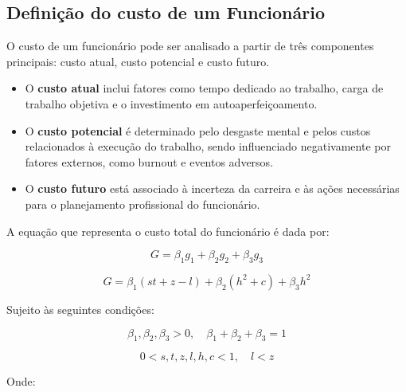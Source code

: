 \documentclass[
	article,			%
	11pt,				%
	oneside,			%
	a4paper,			%
	english,			%
	brazil,				%
	sumario=tradicional
	]{abntex2}
\begin{document}
\subsection{Definição do custo de um Funcionário}

O custo de um funcionário pode ser analisado a partir de três componentes principais: custo atual, custo potencial e custo futuro.

\begin{itemize}
    \item O \textbf{custo atual} inclui fatores como tempo dedicado ao trabalho, carga de trabalho objetiva e o investimento em autoaperfeiçoamento.
    \item O \textbf{custo potencial} é determinado pelo desgaste mental e pelos custos relacionados à execução do trabalho, sendo influenciado negativamente por fatores externos, como burnout e eventos adversos.
    \item O \textbf{custo futuro} está associado à incerteza da carreira e às ações necessárias para o planejamento profissional do funcionário.
\end{itemize}

A equação que representa o custo total do funcionário é dada por:

\begin{equation}
    G = \beta_1 g_1 + \beta_2 g_2 + \beta_3 g_3
\end{equation}

\begin{equation}
    G = \beta_1 (s t + z - l) + \beta_2 (h^2 + c) + \beta_3 h^2
\end{equation}

Sujeito às seguintes condições:

\begin{equation}
    \beta_1, \beta_2, \beta_3 > 0, \quad \beta_1 + \beta_2 + \beta_3 = 1
\end{equation}

\begin{equation}
    0 < s, t, z, l, h, c < 1, \quad l < z
\end{equation}

Onde:
\end{document}
